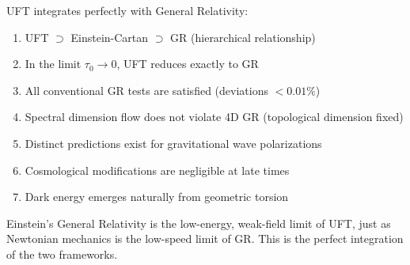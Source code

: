 UFT integrates perfectly with General Relativity:
\begin{enumerate}
    \item UFT $\supset$ Einstein-Cartan $\supset$ GR (hierarchical relationship)
    \item In the limit $\tau_0 \to 0$, UFT reduces exactly to GR
    \item All conventional GR tests are satisfied (deviations $< 0.01\%$)
    \item Spectral dimension flow does not violate 4D GR (topological dimension fixed)
    \item Distinct predictions exist for gravitational wave polarizations
    \item Cosmological modifications are negligible at late times
    \item Dark energy emerges naturally from geometric torsion
\end{enumerate}

Einstein's General Relativity is the low-energy, weak-field limit of UFT, just as Newtonian mechanics is the low-speed limit of GR. This is the perfect integration of the two frameworks.
